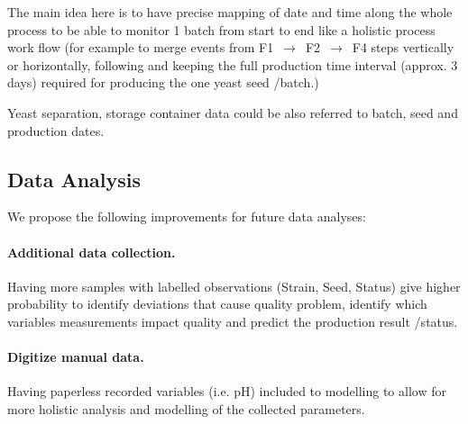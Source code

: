 The main idea here is to have  precise mapping of date and time along the whole process to be able to monitor 1 batch from start to end like a holistic process work flow (for example to merge events from F1 $\,\to\,$ F2 $\,\to\,$ F4 steps vertically or horizontally, following and keeping  the full production time interval (approx. 3 days) required for producing the one yeast seed /batch.) 

Yeast separation, storage container data could be also referred to batch, seed and production dates. 

\subsection{Data Analysis}
We propose the following improvements for future data analyses:

\paragraph{Additional data collection.} Having more samples with labelled observations (Strain, Seed, Status) give higher probability to identify deviations that cause quality problem, identify which variables measurements impact quality and predict the production result /status.
\paragraph{Digitize manual data.} Having paperless recorded variables (i.e. pH) included to modelling to allow for more holistic analysis and modelling of the collected parameters. 
